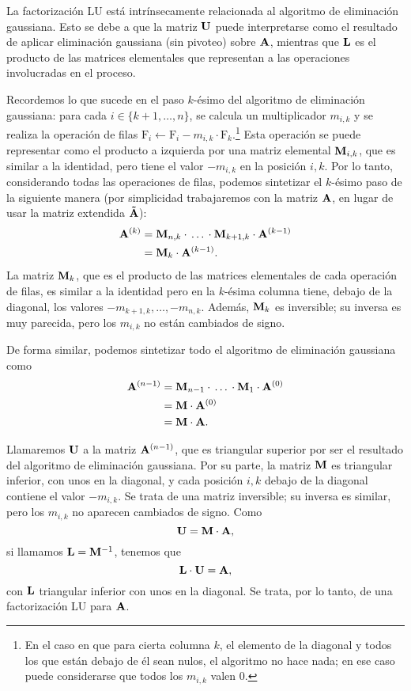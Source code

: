 La factorización LU está intrínsecamente relacionada al algoritmo de
eliminación gaussiana.
Esto se debe a que la matriz $\mathbf{U}$ puede interpretarse como el resultado
de aplicar eliminación gaussiana (sin pivoteo) sobre $\mathbf{A}$, mientras
que $\mathbf{L}$ es el producto de las matrices elementales que representan a
las operaciones involucradas en el proceso.

Recordemos lo que sucede en el paso $k$-ésimo
del algoritmo de eliminación gaussiana: para cada $i \in \{k+1,\dots,n\}$, se
calcula un multiplicador $m_{i,k}$ y se realiza la operación de filas
$\mathrm{F}_i \gets \mathrm{F}_i - m_{i,k} \cdot \mathrm{F}_k$.\footnote{En el
caso en que para cierta columna $k$, el elemento de la diagonal y todos los
que están debajo de él sean nulos, el algoritmo no hace nada; en ese caso
puede considerarse que todos los $m_{i,k}$ valen $0$.} Esta operación se puede
representar como el producto a izquierda por una matriz elemental
$\mathbf{M}_{i,k}$, que es similar a la identidad, pero tiene el valor $-m_{i,k}$
en la posición $i,k$. Por lo tanto, considerando todas las operaciones de
filas, podemos sintetizar el $k$-ésimo paso de la siguiente manera (por
simplicidad trabajaremos con la matriz $\mathbf{A}$, en lugar de usar la matriz
extendida $\mathbf{\tilde A}$):
\[ \begin{aligned}
    \mathbf{A}^{(k)}
    &= \mathbf{M}_{n,k} \cdot \, \dots \, \cdot \mathbf{M}_{k+1,k} \cdot
        \mathbf{A}^{(k-1)} \\
    &= \mathbf{M}_{k} \cdot \mathbf{A}^{(k-1)}.
\end{aligned} \]
La matriz $\mathbf{M}_{k}$, que es el producto de las matrices elementales
de cada operación de filas, es similar a la identidad pero en la $k$-ésima
columna tiene, debajo de la diagonal, los valores
$-m_{k+1,k}, \dots, -m_{n,k}$. Además, $\mathbf{M}_{k}$ es inversible; su inversa
es muy parecida, pero los $m_{i,k}$ no están cambiados de signo.

De forma similar, podemos sintetizar todo el algoritmo de eliminación
gaussiana como
\[ \begin{aligned}
    \mathbf{A}^{(n-1)}
    &= \mathbf{M}_{n-1} \cdot \, \dots \, \cdot \mathbf{M}_{1} \cdot
        \mathbf{A}^{(0)} \\
    &= \mathbf{M} \cdot \mathbf{A}^{(0)} \\
    &= \mathbf{M} \cdot \mathbf{A}.
\end{aligned} \]

Llamaremos $\mathbf{U}$ a la matriz $\mathbf{A}^{(n-1)}$, que es triangular superior
por ser el resultado del algoritmo de eliminación gaussiana. Por su parte,
la matriz $\mathbf{M}$ es triangular inferior, con unos en la diagonal, y
cada posición $i,k$ debajo de la diagonal contiene el valor $-m_{i,k}$. Se
trata de una matriz inversible; su inversa es similar, pero los $m_{i,k}$
no aparecen cambiados de signo. Como
\[ \mathbf{U} = \mathbf{M} \cdot \mathbf{A}, \]
si llamamos $\mathbf{L} = \mathbf{M}^{-1}$, tenemos que
\[ \mathbf{L} \cdot \mathbf{U} = \mathbf{A}, \]
con $\mathbf{L}$ triangular inferior con unos en la diagonal. Se trata, por lo
tanto, de una factorización LU para $\mathbf{A}$.

